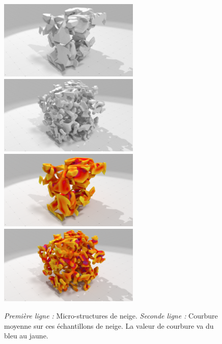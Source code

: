 \begin{figure}[ht]
    \begin{center}
    \includegraphics[trim={17cm 0 13cm 0},clip,width=6.7cm]{images/digitalSnow/SnowE2_DigitalData}
    \includegraphics[trim={17cm 0 13cm 0},clip,width=6.7cm]{images/digitalSnow/SnowI08_DigitalData}\\
    \includegraphics[trim={17cm 0 13cm 0},clip,width=6.7cm]{images/digitalSnow/snowE2mean_0001}
    \includegraphics[trim={17cm 0 13cm 0},clip,width=6.7cm]{images/digitalSnow/snowI08mean_0001}
    \end{center}
    \caption{\emph{Première ligne :} Micro-structures de neige.
						 \emph{Seconde ligne :} Courbure moyenne sur ces échantillons de neige. La valeur de courbure va du bleu au jaune.
						 \label{fig:digitalSnow-curv}}
\end{figure}

